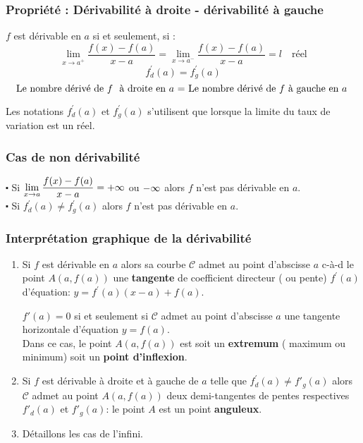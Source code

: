 \begin{example}
  \subsubsection*{Propriété : Dérivabilité à droite - dérivabilité à gauche}
  \begin{property}
$ f $ est dérivable en $ a $ si et seulement, si :\[  \displaystyle\lim_{x \to a^{+}} \frac{f(x)-f(a)}{x-a}=\displaystyle\lim_{x \to a^{-}} \frac{f(x)-f(a)}{x-a}=l \quad \text{réel}\]
\[f^{'}_{d}(a)=f^{'}_{g}(a)\]
\[\textrm{Le nombre dérivé de} \  f \ \textrm{ à droite en $ a$ = Le nombre dérivé de}\  f \ \textrm{à gauche en $a $ }\]
\end{property}
\begin{notation}
Les notations \;   $f^{'}_{d}(a)$ et $f^{'}_{g}(a)$ s'utilisent que lorsque la limite du taux de variation est un réel.
\end{notation}
\subsubsection*{Cas de non dérivabilité}
$ \centerdot $ Si $\displaystyle \lim_{x \to a } \frac{f(x)-f(a)}{x-a}=+\infty$ ou $-\infty $ alors $ f $ n'est pas dérivable en $ a $.\\
$ \centerdot $ Si $ f^{'}_{d}(a) \neq f^{'}_{g}(a) $ alors $ f $ n'est pas dérivable en $ a $.
\subsubsection*{Interprétation graphique de la dérivabilité}
\begin{enumerate}
\item Si $ f $ est dérivable en $ a $ alors sa courbe $ \mathcal{C} $ admet au point d'abscisse  $ a $  c-à-d le point $A(a,f(a))$ une \textbf{ tangente} de coefficient directeur ( ou pente) $  f^{'}(a)$ d'équation:  
$ y=f^{'}(a)(x-a)+ f(a) $.


\begin{remark}
 $  f'(a)=0$  si et seulement si $ \mathcal{C} $ admet au point d'abscisse  $ a $ une tangente horizontale d'équation $ y=f(a). $ \\ Dans ce cas, le point $A(a,f(a))$  est  soit un \textbf{extremum} ( maximum ou minimum) soit un \textbf{point d'inflexion}.
 \end{remark}
 \item Si $ f $ est dérivable  à droite et à gauche  de $ a $ telle que $ f^{'}_{d}(a)\neq f'_{g}(a) $ alors $ \mathcal{C} $ admet au  point $A(a,f(a))$ deux demi-tangentes de pentes respectives  $ f'_{d}(a)$ et $ f'_{g}(a) $: le point $A$ est un point \textbf{anguleux}.
 \item Détaillons les cas de l'infini.


\end{enumerate}
\end{example}
